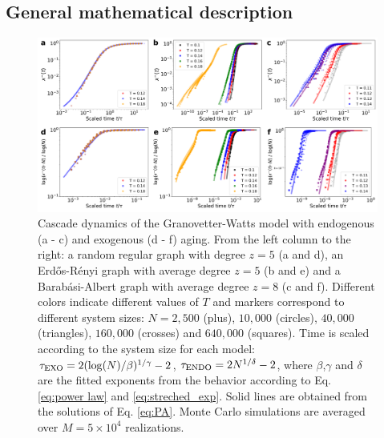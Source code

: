 \subsection{\label{subsec:Approximate master equation and solutions} General mathematical description}

\begin{figure}
    \centering \captionsetup{font=sf}
    \includegraphics[width=\linewidth]{Figs/Aging_Threshold/FIG_EVO_EXO_ENDO.pdf}
    \caption[Cascade dynamics of the Granovetter-Watts model in graphs]{\label{fig:exo_endo_evo} Cascade dynamics of the Granovetter-Watts model with endogenous (a - c) and exogenous (d - f) aging. From the left column to the right: a random regular graph with degree $z=5$ (a and d), an Erd\H{o}s-R\'enyi graph with average degree $z = 5$ (b and e) and a Barab\'asi-Albert graph with average degree $z = 8$ (c and f). Different colors indicate different values of $T$ and markers correspond to different system sizes: $N = 2,500$ (plus), $10,000$ (circles), $40,000$ (triangles), $160,000$ (crosses) and $640,000$ (squares). Time is scaled according to the system size for each model: $\tau_{\rm{EXO}} = 2(\log(N)/\beta)^{1/\gamma} - 2$, $\tau_{\rm{ENDO}} = 2N^{1/\delta} - 2$, where $\beta$,$\gamma$ and $\delta$ are the fitted exponents from the behavior according to Eq. \eqref{eq:power law} and \eqref{eq:streched_exp}. Solid lines are obtained from the solutions of Eq. \eqref{eq:PA}. Monte Carlo simulations are averaged over $M = 5 \times 10^4$ realizations.}
\end{figure}

